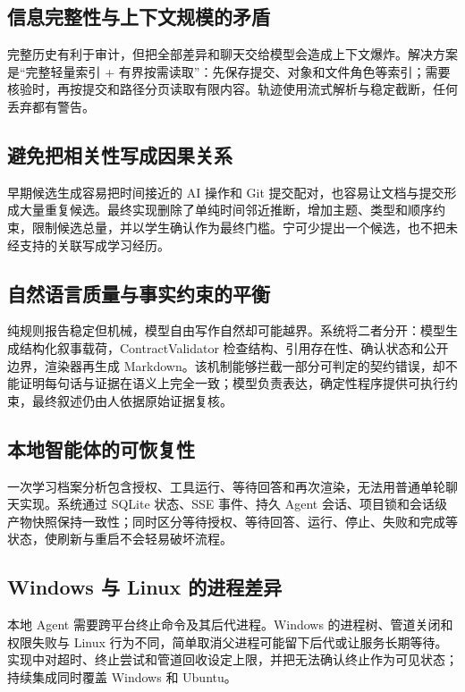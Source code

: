 \documentclass[UTF8,a4paper,12pt]{ctexart}
\begin{document}
\subsection{信息完整性与上下文规模的矛盾}

完整历史有利于审计，但把全部差异和聊天交给模型会造成上下文爆炸。解决方案是“完整轻量索引 + 有界按需读取”：先保存提交、对象和文件角色等索引；需要核验时，再按提交和路径分页读取有限内容。轨迹使用流式解析与稳定截断，任何丢弃都有警告。

\subsection{避免把相关性写成因果关系}

早期候选生成容易把时间接近的 AI 操作和 Git 提交配对，也容易让文档与提交形成大量重复候选。最终实现删除了单纯时间邻近推断，增加主题、类型和顺序约束，限制候选总量，并以学生确认作为最终门槛。宁可少提出一个候选，也不把未经支持的关联写成学习经历。

\subsection{自然语言质量与事实约束的平衡}

纯规则报告稳定但机械，模型自由写作自然却可能越界。系统将二者分开：模型生成结构化叙事载荷，ContractValidator 检查结构、引用存在性、确认状态和公开边界，渲染器再生成 Markdown。该机制能够拦截一部分可判定的契约错误，却不能证明每句话与证据在语义上完全一致；模型负责表达，确定性程序提供可执行约束，最终叙述仍由人依据原始证据复核。

\subsection{本地智能体的可恢复性}

一次学习档案分析包含授权、工具运行、等待回答和再次渲染，无法用普通单轮聊天实现。系统通过 SQLite 状态、SSE 事件、持久 Agent 会话、项目锁和会话级产物快照保持一致性；同时区分等待授权、等待回答、运行、停止、失败和完成等状态，使刷新与重启不会轻易破坏流程。

\subsection{Windows 与 Linux 的进程差异}

本地 Agent 需要跨平台终止命令及其后代进程。Windows 的进程树、管道关闭和权限失败与 Linux 行为不同，简单取消父进程可能留下后代或让服务长期等待。实现中对超时、终止尝试和管道回收设定上限，并把无法确认终止作为可见状态；持续集成同时覆盖 Windows 和 Ubuntu。
\end{document}
